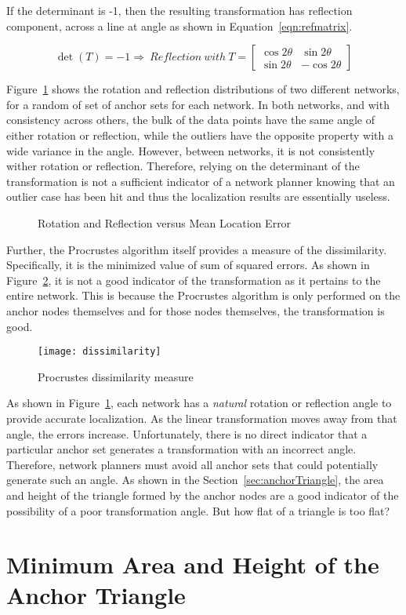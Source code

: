 If the determinant is -1, then the resulting transformation has reflection component, across a line at angle as shown in Equation~\ref{eqn:refmatrix}. 

\begin{equation}
	\det{(T)}=-1 \Rightarrow ~Reflection ~with ~T=
	\begin{bmatrix}
	\cos{2{\theta}} & \sin{2{\theta}} \\ 
	\sin{2{\theta}} & -\cos{2{\theta}}\end{bmatrix}
	\label{eqn:refmatrix} 
\end{equation}

Figure~\ref{fig:rotref} shows the rotation and reflection distributions of two different networks, for a random of set of anchor sets for each network.  In both networks, and with consistency across others, the bulk of the data points have the same angle of either rotation or reflection, while the outliers have the opposite property with a wide variance in the angle.  However, between networks, it is not consistently wither rotation or reflection.  Therefore, relying on the determinant of the transformation is not a sufficient indicator of a network planner knowing that an outlier case has been hit and thus the localization results are essentially useless.

\begin{figure}
  \centering
	\caption{Rotation and Reflection versus Mean Location Error}	
	\label{fig:rotref}
\end{figure}

Further, the Procrustes algorithm itself provides a measure of the dissimilarity.  Specifically, it is the minimized value of sum of squared errors\cite{procrustes-matlab}.  As shown in Figure~\ref{fig:dissimilarity}, it is not a good indicator of the transformation as it pertains to the entire network.  This is because the Procrustes algorithm is only performed on the anchor nodes themselves and for those nodes themselves, the transformation is good.

\begin{figure}
  \centering
	\texttt{[image: dissimilarity]}
	\caption{Procrustes dissimilarity measure}	
	\label{fig:dissimilarity}
\end{figure}

As shown in Figure~\ref{fig:rotref}, each network has a \emph{natural} rotation or reflection angle to provide accurate localization.  As the linear transformation moves away from that angle, the errors increase.  Unfortunately, there is no direct indicator that a particular anchor set generates a transformation with an incorrect angle.  Therefore, network planners must avoid all anchor sets that could potentially generate such an angle.  As shown in the Section~\ref{sec:anchorTriangle}, the area and height of the triangle formed by the anchor nodes are a good indicator of the possibility of a poor transformation angle.  But how flat of a triangle is too flat?

\section{Minimum Area and Height of the Anchor Triangle} 
